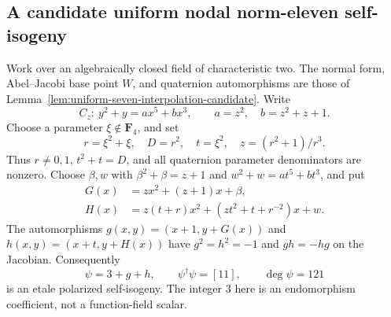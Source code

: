 \subsection{A candidate uniform nodal norm-eleven self-isogeny}
\label{subsec:uniform-eleven-theta-candidate}

Work over an algebraically closed field of characteristic two.  The
normal form, Abel--Jacobi base point $W$, and quaternion automorphisms
are those of Lemma~\ref{lem:uniform-seven-interpolation-candidate}.
Write
\[
 C_z:\ y^2+y=ax^5+bx^3,\qquad a=z^2,\quad b=z^2+z+1.
\]
Choose a parameter $\xi\notin\mathbf F_4$, and set
\[
 r=\xi^2+\xi,\quad D=r^2,\quad t=\xi^2,\quad
 z=(r^2+1)/r^3.
 \tag{E11.1}
\]
Thus $r\ne0,1$, $t^2+t=D$, and all quaternion parameter denominators
are nonzero. Choose $\beta,w$ with
$\beta^2+\beta=z+1$ and $w^2+w=at^5+bt^3$, and put
\[
 \begin{split}
 G(x)&=zx^2+(z+1)x+\beta,\\
 H(x)&=z(t+r)x^2+(zt^2+t+r^{-2})x+w.
 \end{split}
\]
The automorphisms $g(x,y)=(x+1,y+G(x))$ and
$h(x,y)=(x+t,y+H(x))$ have $g^2=h^2=-1$ and $gh=-hg$ on the
Jacobian. Consequently
\[
 \psi=3+g+h,\qquad \psi^\dagger\psi=[11],\qquad \deg\psi=121
 \tag{E11.2}
\]
is an etale polarized self-isogeny. The integer $3$ here is an
endomorphism coefficient, not a function-field scalar.

